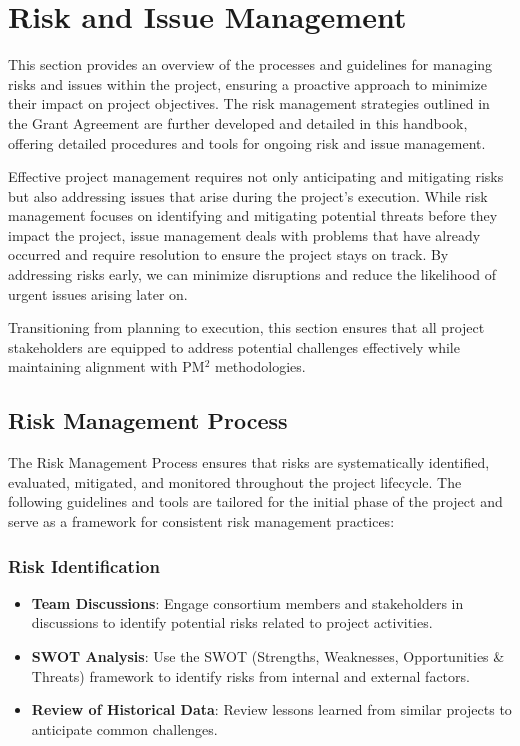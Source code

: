 \documentclass[a4paper,12pt]{article}
\begin{document}
\newpage

\section{\textcolor{EUblue}{Risk and Issue Management}}
\label{sec:risk_management}

This section provides an overview of the processes and guidelines for managing risks and issues within the project, ensuring a proactive approach to minimize their impact on project objectives. The risk management strategies outlined in the Grant Agreement are further developed and detailed in this handbook, offering detailed procedures and tools for ongoing risk and issue management.

Effective project management requires not only anticipating and mitigating risks but also addressing issues that arise during the project's execution. While risk management focuses on identifying and mitigating potential threats before they impact the project, issue management deals with problems that have already occurred and require resolution to ensure the project stays on track. By addressing risks early, we can minimize disruptions and reduce the likelihood of urgent issues arising later on.

Transitioning from planning to execution, this section ensures that all project stakeholders are equipped to address potential challenges effectively while maintaining alignment with PM$^2$ methodologies.

\subsection{\textcolor{EUblue}{Risk Management Process}}
The Risk Management Process ensures that risks are systematically identified, evaluated, mitigated, and monitored throughout the project lifecycle. The following guidelines and tools are tailored for the initial phase of the project and serve as a framework for consistent risk management practices:

\subsubsection*{Risk Identification}
\begin{itemize}[left=1em, itemsep=0pt, topsep=0pt] 
    \item \textbf{Team Discussions}: Engage consortium members and stakeholders in discussions to identify potential risks related to project activities.
    \item \textbf{SWOT Analysis}: Use the SWOT (Strengths, Weaknesses, Opportunities \& Threats) framework to identify risks from internal and external factors.
    \item \textbf{Review of Historical Data}: Review lessons learned from similar projects to anticipate common challenges.
\end{itemize}
\end{document}
